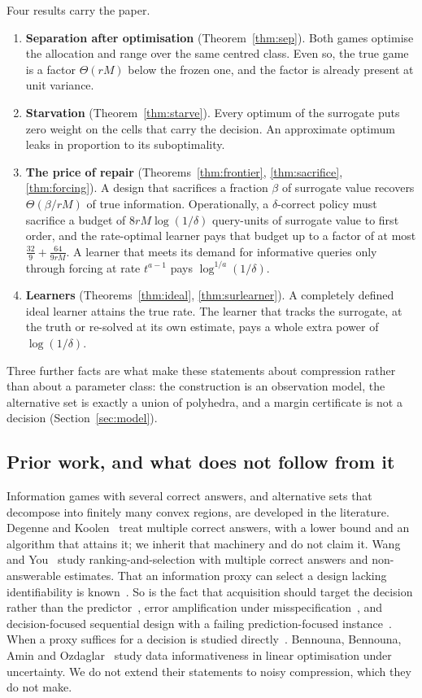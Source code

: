 Four results carry the paper.
\begin{enumerate}
\item[1)] \textbf{Separation after optimisation} (Theorem~\ref{thm:sep}). Both games optimise
the allocation and range over the same centred class. Even so, the true game is a factor
$\Theta(rM)$ below the frozen one, and the factor is already present at unit variance.
\item[2)] \textbf{Starvation} (Theorem~\ref{thm:starve}). Every optimum of the surrogate puts
zero weight on the cells that carry the decision. An approximate optimum leaks in proportion
to its suboptimality.
\item[3)] \textbf{The price of repair} (Theorems~\ref{thm:frontier}, \ref{thm:sacrifice},
\ref{thm:forcing}). A design that sacrifices a fraction $\beta$ of surrogate value recovers
$\Theta(\beta/rM)$ of true information. Operationally, a $\delta$-correct policy must sacrifice
a budget of $8rM\log(1/\delta)$ query-units of surrogate value to first order, and the
rate-optimal learner pays that budget up to a factor of at most $\frac{32}{9}+\frac{64}{9rM}$.
A learner that meets its demand for informative queries only through forcing at rate
$t^{a-1}$ pays $\log^{1/a}(1/\delta)$.
\item[4)] \textbf{Learners} (Theorems~\ref{thm:ideal}, \ref{thm:surlearner}). A completely
defined ideal learner attains the true rate. The learner that tracks the surrogate, at the
truth or re-solved at its own estimate, pays a whole extra power of $\log(1/\delta)$.
\end{enumerate}
Three further facts are what make these statements about compression rather than about a
parameter class: the construction is an observation model, the alternative set is exactly a
union of polyhedra, and a margin certificate is not a decision (Section~\ref{sec:model}).

\subsection{Prior work, and what does not follow from it}

Information games with several correct answers, and alternative sets that decompose into
finitely many convex regions, are developed in the literature. Degenne and
Koolen~\cite{degenne2019} treat multiple correct answers, with a lower bound and an algorithm
that attains it; we inherit that machinery and do not claim it. Wang and You~\cite{wangyou2026}
study ranking-and-selection with multiple correct answers and non-answerable estimates. That
an information proxy can select a design lacking identifiability is
known~\cite{overstall2022}. So is the fact that acquisition should target the decision rather
than the predictor~\cite{filstroff2021}, error amplification under
misspecification~\cite{tang2026}, and decision-focused sequential design with a failing
prediction-focused instance~\cite{wan2026}. When a proxy suffices for a decision is studied
directly~\cite{schutte2026}. Bennouna, Bennouna, Amin and Ozdaglar~\cite{bennouna2026} study
data informativeness in linear optimisation under uncertainty. We do not extend their
statements to noisy compression, which they do not make.

